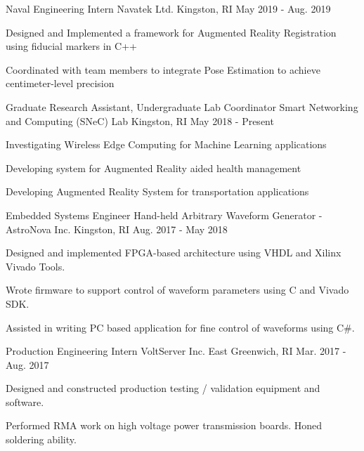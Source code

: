 \begin{cventries}
   \cventry
     {Naval Engineering Intern}
     {Navatek Ltd.}
     {Kingston, RI}
     {May 2019 - Aug. 2019}
     {
       \begin{cvitems}
        \item{Designed and Implemented a framework for Augmented Reality Registration using fiducial markers in C++}
        \item{Coordinated with team members to integrate Pose Estimation to achieve centimeter-level precision}
       \end{cvitems}
     }
  \cventry
    {Graduate Research Assistant, Undergraduate Lab Coordinator}
    {Smart Networking and Computing (SNeC) Lab}
    {Kingston, RI}
    {May 2018 - Present}
    {
      \begin{cvitems} 
        \item{Investigating Wireless Edge Computing for Machine Learning applications}
        \item{Developing system for Augmented Reality aided health management}
        \item{Developing Augmented Reality System for transportation applications} 
      \end{cvitems}
    }
    
  \cventry
    {Embedded Systems Engineer}
    {Hand-held Arbitrary Waveform Generator - AstroNova Inc.}
    {Kingston, RI}
    {Aug. 2017 - May 2018}
    {
      \begin{cvitems}
        \item {Designed and implemented FPGA-based architecture using VHDL and Xilinx Vivado Tools.}
        \item {Wrote firmware to support control of waveform parameters using C and Vivado SDK.}
        \item {Assisted in writing PC based application for fine control of waveforms using C\#.}
      \end{cvitems}
    }
  \cventry
    {Production Engineering Intern}
    {VoltServer Inc.}
    {East Greenwich, RI}
    {Mar. 2017 - Aug. 2017}
    {
      \begin{cvitems}
        \item {Designed and constructed production testing / validation equipment and software.}
        \item {Performed RMA work on high voltage power transmission boards. Honed soldering ability.}
      \end{cvitems}
    }
 \end{cventries}
